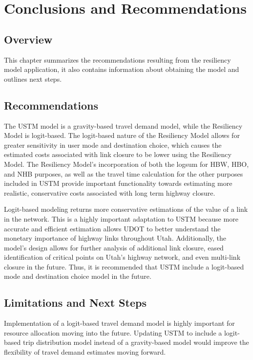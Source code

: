 \chapter{Conclusions and Recommendations}
\label{chp:chapter5}
\graphicspath{{figures/}{figures/chapter5/}}

\section{Overview}

This chapter summarizes the recommendations resulting from the resiliency
model application, it also contains information about obtaining the model and
outlines next steps.

\section{Recommendations}

The USTM model is a gravity-based travel demand model, while the Resiliency
Model is logit-based. The logit-based nature of the Resiliency Model allows
for greater sensitivity in user mode and destination choice, which causes
the estimated costs associated with link closure to be lower using the Resiliency Model. The Resiliency
Model's incorporation of both the logsum for HBW, HBO, and NHB purposes, as
well as the travel time calculation for the other purposes included in USTM
provide important functionality towards estimating more realistic, conservative costs
associated with long term highway closure.

Logit-based modeling returns more conservative
estimations of the value of a link in the network. This is a highly
important adaptation to USTM because more accurate and efficient estimation allows
UDOT to better understand the monetary importance of highway links
throughout Utah. Additionally, the model’s design allows for further
analysis of additional link closure, eased identification of critical
points on Utah's highway network, and even multi-link closure in the
future. Thus, it is recommended that USTM include a logit-based mode and destination
choice model in the future.

\section{Limitations and Next Steps}

Implementation of a logit-based travel demand model is highly important for
resource allocation moving into the future. Updating USTM to include a
logit-based trip distribution model instead of a gravity-based model would
improve the flexibility of travel demand estimates moving forward.

